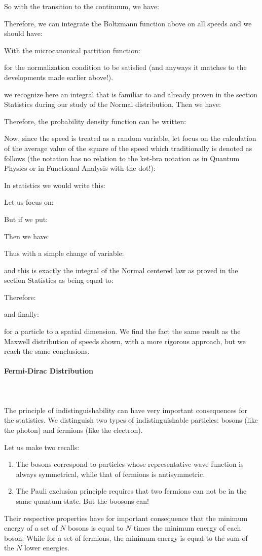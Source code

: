 	So with the transition to the continuum, we have:
	
	Therefore, we can integrate the Boltzmann function above on all speeds and we should have:
	
	With the microcanonical partition function:
	
	for the normalization condition to be satisfied (and anyways it matches to the developments made earlier above!).

	we recognize here an integral that is familiar to and already proven in the section Statistics during our study of the Normal distribution. Then we have:
	
	Therefore, the probability density function can be written:
	
	Now, since the speed is treated as a random variable, let focus on the calculation of the average value of the  square of the speed which traditionally is denoted as follows (the notation has no relation to the ket-bra notation as in Quantum Physics or in Functional Analysis with the dot!):
	
	In statistics we would write this:
	
	Let us focus on:
	
	But if we put:
	
	Then we have:
	
	Thus with a simple change of variable:
	
	and this is exactly the integral of the Normal centered  law as proved in the section Statistics as being equal to:
	
	Therefore:
	
	and finally:
	
	for a particle to a spatial dimension. We find the fact the same result as the Maxwell distribution of speeds shown, with a more rigorous approach, but we reach the same conclusions.
	
	\paragraph{Fermi-Dirac Distribution}\mbox{}\\\\
	The principle of indistinguishability can have very important consequences for the statistics. We distinguish two types of indistinguishable particles: bosons (like the photon) and fermions (like the electron).

	Let us make two recalls:
	\begin{enumerate}
		\item The bosons correspond to particles whose representative wave function is always symmetrical, while that of fermions is antisymmetric.

		\item The Pauli exclusion principle requires that two fermions can not be in the same quantum state. But the boosons can!
	\end{enumerate}
	Their respective properties have for important consequence that the minimum energy of a set of $N$ bosons is equal to $N$ times the minimum energy of each boson. While for a set of fermions, the minimum energy is equal to the sum of the $N$ lower energies.

